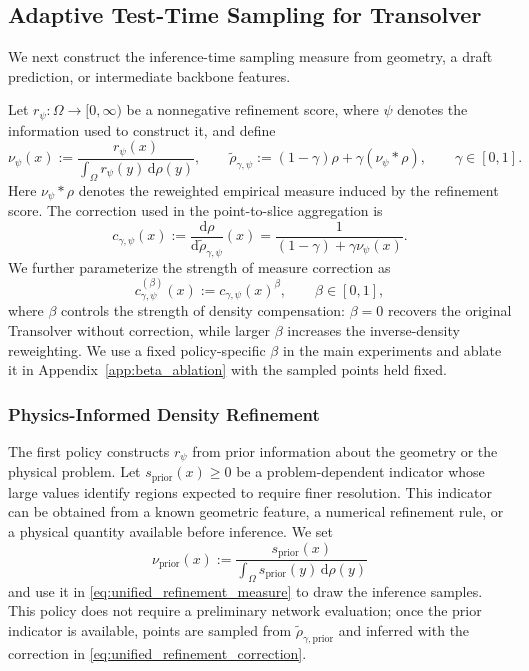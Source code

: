 \subsection{Adaptive Test-Time Sampling for Transolver}
\label{sec:adaptive_test_time_sampling}

We next construct the inference-time sampling measure from geometry, a draft prediction, or intermediate backbone features.

Let $r_{\psi}:\Omega\to[0,\infty)$ be a nonnegative refinement score, where $\psi$ denotes the information used to construct it, and define
\begin{equation}
    \nu_{\psi}(x)
    :=\frac{r_{\psi}(x)}{\int_{\Omega}r_{\psi}(y)\,\mathrm{d}\rho(y)},
    \qquad
    \widetilde{\rho}_{\gamma,\psi}
    :=(1-\gamma)\rho+\gamma(\nu_{\psi}*\rho),
    \qquad \gamma\in[0,1].
    \label{eq:unified_refinement_measure}
\end{equation}
Here $\nu_{\psi}*\rho$ denotes the reweighted empirical measure induced by the refinement score. The correction used in the point-to-slice aggregation is
\begin{equation}
    c_{\gamma,\psi}(x)
    :=\frac{\mathrm{d}\rho}{\mathrm{d}\widetilde{\rho}_{\gamma,\psi}}(x)
    =\frac{1}{(1-\gamma)+\gamma\nu_{\psi}(x)}.
    \label{eq:unified_refinement_correction}
\end{equation}
We further parameterize the strength of measure correction as
\begin{equation}
    c_{\gamma,\psi}^{(\beta)}(x)
    := c_{\gamma,\psi}(x)^{\beta},
    \qquad \beta\in[0,1],
\end{equation}
where $\beta$ controls the strength of density compensation: $\beta=0$ recovers the original Transolver without correction, while larger $\beta$ increases the inverse-density reweighting. We use a fixed policy-specific $\beta$ in the main experiments and ablate it in Appendix~\ref{app:beta_ablation} with the sampled points held fixed.
\subsubsection{Physics-Informed Density Refinement}
\label{sec:physics_informed_refinement}

The first policy constructs $r_{\psi}$ from prior information about the geometry
or the physical problem. Let $s_{\mathrm{prior}}(x)\geq0$ be a problem-dependent
indicator whose large values identify regions expected to require finer resolution.
This indicator can be obtained from a known geometric feature, a numerical
refinement rule, or a physical quantity available before inference. We set
\begin{equation}
    \nu_{\mathrm{prior}}(x)
    :=\frac{s_{\mathrm{prior}}(x)}
    {\int_{\Omega}s_{\mathrm{prior}}(y)\,\mathrm{d}\rho(y)}
    \label{eq:prior_refinement_kernel}
\end{equation}
and use it in \eqref{eq:unified_refinement_measure} to draw the inference samples. This policy does not require a preliminary network evaluation; once the prior indicator is available, points are sampled from $\widetilde{\rho}_{\gamma,\mathrm{prior}}$ and inferred with the correction in \eqref{eq:unified_refinement_correction}.


